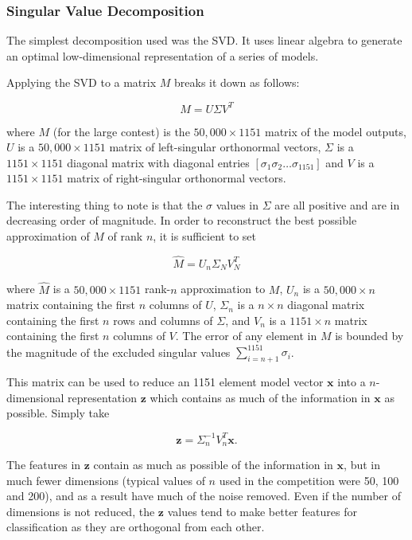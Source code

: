 \documentclass{article}
\begin{document}
\subsubsection{Singular Value Decomposition}

The simplest decomposition used was the SVD.  It uses linear algebra to generate an optimal low-dimensional representation of a series of models.

Applying the SVD to a matrix $M$ breaks it down as follows:

\begin{equation}
M = U \Sigma V^T
\end{equation}

where $M$ (for the large contest) is the $50,000 \times 1151$ matrix of the model outputs, $U$ is a $50,000 \times 1151$ matrix of left-singular orthonormal vectors, $\Sigma$ is a $1151 \times 1151$ diagonal matrix with diagonal entries $[ \sigma_1 \sigma_2 \ldots \sigma_{1151}]$ and $V$ is a $1151 \times 1151$ matrix of right-singular orthonormal vectors.

The interesting thing to note is that the $\sigma$ values in $\Sigma$ are all positive and are in decreasing order of magnitude.  In order to reconstruct the best possible approximation of $M$ of rank $n$, it is sufficient to set

\begin{equation}
\hat{M} = U_n \Sigma_N V_N^T
\end{equation}

where $\hat{M}$ is a $50,000 \times 1151$ rank-$n$ approximation to $M$, $U_n$ is a $50,000 \times n$ matrix containing the first $n$ columns of $U$, $\Sigma_n$ is a $n \times n$ diagonal matrix containing the first $n$ rows and columns of $\Sigma$, and $V_n$ is a $1151 \times n$ matrix containing the first $n$ columns of $V$.  The error of any element in $M$ is bounded by the magnitude of the excluded singular values $\sum_{i=n+1}^{1151} \sigma_i$.

This matrix can be used to reduce an 1151 element model vector $\mathbf{x}$ into a $n$-dimensional representation $\mathbf{z}$ which contains as much of the information in $\mathbf{x}$ as possible.  Simply take

\begin{equation}
\label{eqn:svd-encode}
\mathbf{z} = \Sigma_n^{-1} V_n^T \mathbf{x} .
\end{equation}

The features in $\mathbf{z}$ contain as much as possible of the information in $\mathbf{x}$, but in much fewer dimensions (typical values of $n$ used in the competition were 50, 100 and 200), and as a result have much of the noise removed.  Even if the number of dimensions is not reduced, the $\mathbf{z}$ values tend to make better features for classification as they are orthogonal from each other.
\end{document}
